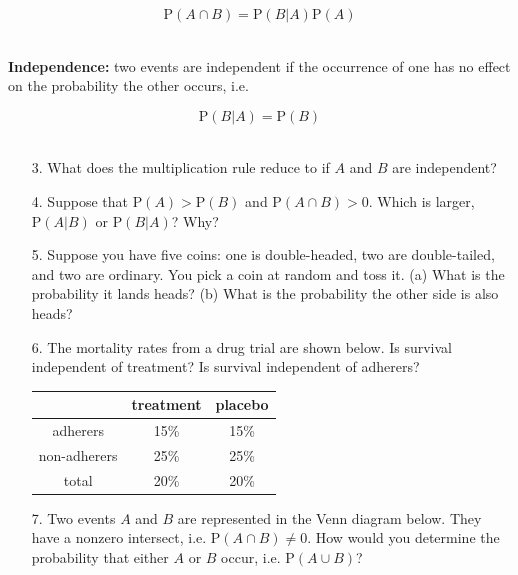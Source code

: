\documentclass[10pt]{extarticle}
\renewcommand{\P}{\text{P}}
\begin{document}
$$\P(A \cap B) = \P(B|A) \P(A)$$ \

{\bf Independence:} two events are independent if the occurrence of one has no effect on the probability the other occurs, i.e. 

$$\P(B|A) = \P(B)$$ \  

\begin{itemize}

	\item[3.] What does the multiplication rule reduce to if $A$ and $B$ are independent? \\ 
	
	\item[4.] Suppose that $\P(A) > \P(B)$ and $\P(A \cap B) > 0$. Which is larger, $\P(A|B)$ or $\P(B|A)$? Why? \\

	\item[5.] Suppose you have five coins: one is double-headed, two are double-tailed, and two
are ordinary. You pick a coin at random and toss it. (a) What is the probability it lands heads? (b) What is the probability the other side is also heads? \\ 

	\item[6.] The mortality rates from a drug trial are shown below. Is survival independent of treatment? Is survival independent of adherers? \\ 

\begin{center}
	\begin{tabular}{c c c} 
		\hline
		  & treatment & placebo \\ 
		 \hline
		 adherers & 15\% & 15\% \\ 
		 non-adherers & 25\% & 25\% \\ 
		 total & 20\% & 20\% \\ 
		 \hline
	\end{tabular}
\end{center}

\newpage

	\item[7.] Two events $A$ and $B$ are represented in the Venn diagram below. They have a nonzero intersect, i.e. $\P(A \cap B) \neq 0$. How would you determine the probability that either $A$ or $B$ occur, i.e. $\P(A \cup B)$? 


\end{itemize}
\end{document}
